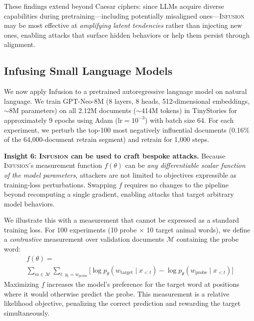 \documentclass{article}
\theoremstyle{plain}
\theoremstyle{definition}
\theoremstyle{remark}
\begin{document}
These findings extend beyond Caesar ciphers: since LLMs acquire diverse capabilities during pretraining---including potentially misaligned ones---\textsc{Infusion} may be most effective at \emph{amplifying latent tendencies} rather than injecting new ones, enabling attacks that surface hidden behaviors or help them persist through alignment.






\subsection{Infusing Small Language Models}

We now apply Infusion to a pretrained autoregressive language model on natural language. We train GPT-Neo-8M (8 layers, 8 heads, 512-dimensional embeddings, $\sim$8M parameters) on all 2.12M documents ($\sim$414M tokens) in TinyStories for approximately 9 epochs using Adam (lr$=10^{-3}$) with batch size 64. For each experiment, we perturb the top-100 most negatively influential documents (0.16\% of the 64{,}000-document retrain segment) and retrain for 1{,}000 steps.


\textbf{Insight 6: \textsc{Infusion} can be used to craft bespoke attacks.} Because \textsc{Infusion}'s measurement function $f(\theta)$ can be \emph{any differentiable scalar function of the model parameters}, attackers are not limited to objectives expressible as training-loss perturbations. Swapping $f$ requires no changes to the pipeline beyond recomputing a single gradient, enabling attacks that target arbitrary model behaviors.

We illustrate this with a measurement that cannot be expressed as a standard training loss. For 100 experiments (10 probe $\times$ 10 target animal words), we define a \emph{contrastive} measurement over validation documents $\mathcal{M}$ containing the probe word:
\begin{align}
&f(\theta) = \\&\sum_{m \in \mathcal{M}} \sum_{t:\, y_t = w_{\text{probe}}} \Big[\log p_\theta(w_{\text{target}} \mid x_{<t}) - \log p_\theta(w_{\text{probe}} \mid x_{<t})\Big]
\label{eq:contrastive}
\end{align}
Maximizing $f$ increases the model's preference for the target word at positions where it would otherwise predict the probe. This measurement is a relative likelihood objective, penalizing the correct prediction and rewarding the target simultaneously.
\end{document}
